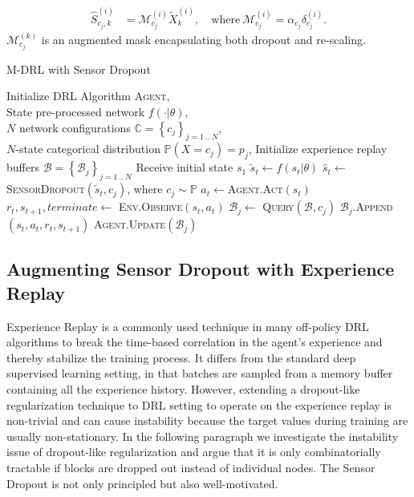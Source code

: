\documentclass[../thesis.tex]{subfiles}
\begin{document}
\begin{align}
\hat{S}^{(i)}_{{c_j},k} &= \mathcal{M}^{(i)}_{c_j} \tilde{X}_k^{(i)}, \ 
&\text{where} \ \mathcal{M}^{(i)}_{c_j} = \alpha_{c_j} \delta_{c_j}^{(i)}. 
\end{align}
$\mathcal{M}^{(k)}_{c_j}$ is an augmented mask encapsulating both dropout and re-scaling. 



\begin{algorithm}[t]
    \caption{M-DRL with Sensor Dropout}
    \label{alg:mdrl-algo}
\begin{algorithmic}
     Initialize DRL Algorithm \textsc{Agent},\\
    \qquad \quad State pre-processed network $f(\cdot|\theta)$, \\
    \qquad \quad $N$ network configurations $\mathbb{C}= \left\{c_j\right\}_{j=1~..~N}$,\\
    \qquad \quad $N$-state categorical distribution $\mathbb{P}(X=c_j) = p_j$,
    \State Initialize experience replay buffers $\mathcal{B} = \left\{\mathcal{B}_j\right\}_{j=1~..~N}$
    \For{$episode=1$ {\bfseries to} $Eps$ }
     \State Receive initial state $s_1$
        \State $\tilde{s}_t \leftarrow f(s_t|\theta)$
        \State $\hat{s}_t \leftarrow$ \textsc{SensorDropout}$(\tilde{s}_t , c_j)$, where $c_j \sim \mathbb{P}$
        \State $a_t \leftarrow $\textsc{Agent.Act}$(\hat{s}_t)$ 
        \State $r_t,s_{t+1},terminate \leftarrow$ \textsc{Env.Observe}$(s_t, a_t)$ 
        \State $\mathcal{B}_j \leftarrow$ \textsc{Query}$(\mathcal{B},c_j)$
        \State $\mathcal{B}_j.$\textsc{Append}$(s_t, a_t, r_t, s_{t+1})$
        \State \textsc{Agent.Update}$(\mathcal{B}_j)$
     \EndFor
    \EndFor
\end{algorithmic}
\end{algorithm}

\subsection{Augmenting Sensor Dropout with Experience Replay}
Experience Replay is a commonly used technique in many off-policy DRL algorithms to break the time-based correlation in the agent's experience and thereby stabilize the training process. It differs from the standard deep supervised learning setting, in that batches are sampled from a memory buffer containing all the experience history. However, extending a dropout-like regularization technique to DRL setting to operate on the experience replay is non-trivial and can cause instability because the target values during training are usually non-stationary. In the following paragraph we investigate the instability issue of dropout-like regularization and argue that it is only combinatorially tractable if blocks are dropped out instead of individual nodes. The Sensor Dropout is not only principled but also well-motivated.
\end{document}
